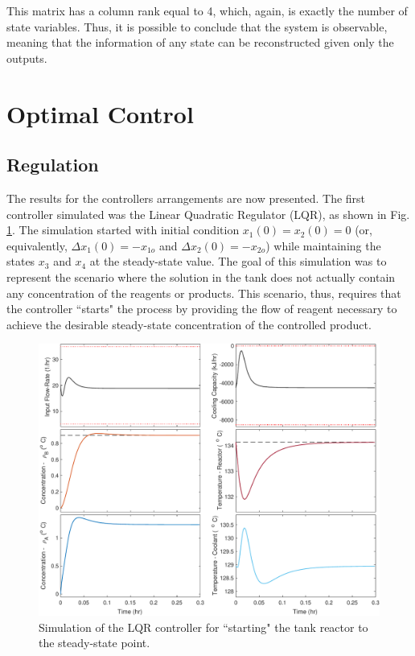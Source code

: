 \documentclass[a4paper,11pt]{book}
\numberwithin{figure}{chapter}
\numberwithin{equation}{chapter}
\numberwithin{table}{chapter}
\theoremstyle{definition}
\begin{document}
\noindent This matrix has a column rank equal to 4, which, again, is exactly the number of state variables. Thus, it is possible to conclude that the system is observable, meaning that the information of any state can be reconstructed given only the outputs. 

\section{Optimal Control}

\subsection{Regulation}

The results for the controllers arrangements are now presented. The first controller simulated was the Linear Quadratic Regulator (LQR), as shown in Fig. \ref{fig:lqr01}. The simulation started with initial condition $x_1(0) = x_2(0) = 0$ (or, equivalently, $\Delta x_1(0) = -x_{1o}$ and $\Delta x_2(0) = -x_{2o}$) while maintaining the states $x_3$ and $x_4$ at the steady-state value. The goal of this simulation was to represent the scenario where the solution in the tank does not actually contain any concentration of the reagents or products. This scenario, thus, requires that the controller ``starts" the process by providing the flow of reagent necessary to achieve the desirable steady-state concentration of the controlled product. 

\begin{figure}[ht] \centering
	\includegraphics[width=\textwidth]{chapter7/lqr01}
	
	\caption{Simulation of the LQR controller for ``starting" the tank reactor to the steady-state point.}
	\label{fig:lqr01}
\end{figure}
\end{document}
